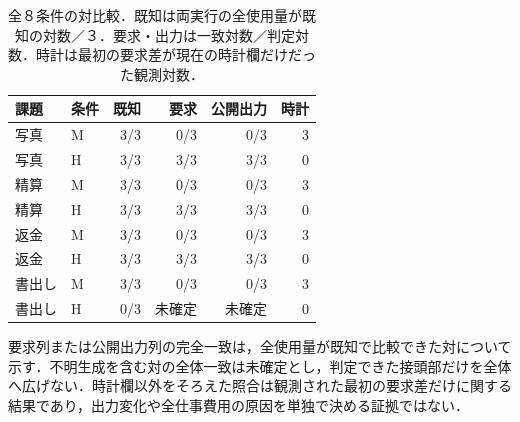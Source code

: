 \begin{table}[tb]
\centering\small\setlength{\tabcolsep}{3pt}
\caption{全８条件の対比較．既知は両実行の全使用量が既知の対数／３．要求・出力は一致対数／判定対数．時計は最初の要求差が現在の時計欄だけだった観測対数．}
\begin{tabular}{llrrrr}
課題 & 条件 & 既知 & 要求 & 公開出力 & 時計 \\ \hline
写真 & M & 3/3 & 0/3 & 0/3 & 3 \\
写真 & H & 3/3 & 3/3 & 3/3 & 0 \\
精算 & M & 3/3 & 0/3 & 0/3 & 3 \\
精算 & H & 3/3 & 3/3 & 3/3 & 0 \\
返金 & M & 3/3 & 0/3 & 0/3 & 3 \\
返金 & H & 3/3 & 3/3 & 3/3 & 0 \\
書出し & M & 3/3 & 0/3 & 0/3 & 3 \\
書出し & H & 0/3 & 未確定 & 未確定 & 0 \\
\hline
\end{tabular}
\end{table}
要求列または公開出力列の完全一致は，全使用量が既知で比較できた対について示す．不明生成を含む対の全体一致は未確定とし，判定できた接頭部だけを全体へ広げない．時計欄以外をそろえた照合は観測された最初の要求差だけに関する結果であり，出力変化や全仕事費用の原因を単独で決める証拠ではない．
